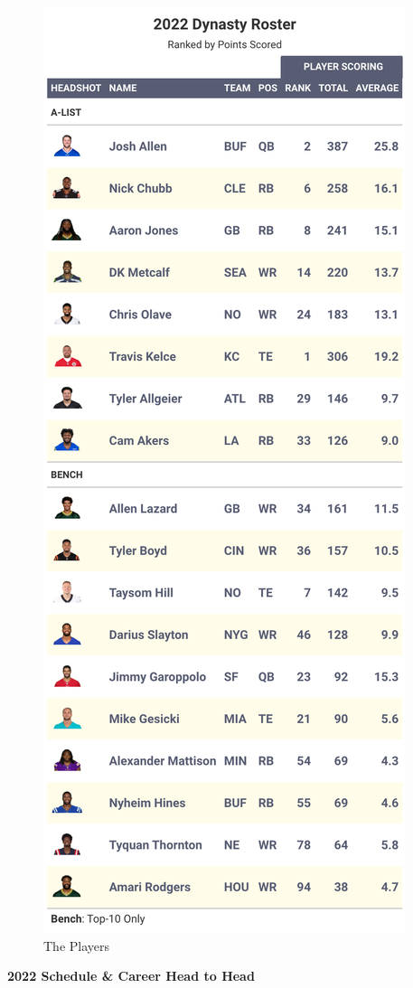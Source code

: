 \documentclass[
]{article}
\begin{document}
\begin{figure}
\includegraphics[width=0.75\linewidth,height=0.75\textheight]{output/2022/dynasty_roster_Nhosta} \caption{The Players}\label{fig:unnamed-chunk-15}
\end{figure}
\newpage

\textbf{2022 Schedule \& Career Head to Head}
\end{document}
